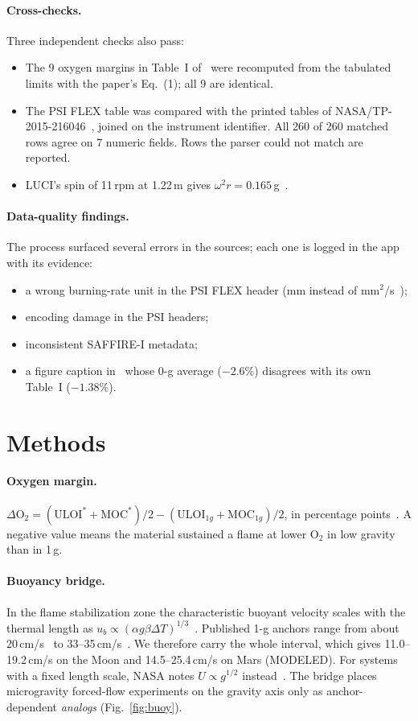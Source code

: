 \documentclass[10pt]{article}
\begin{document}
\paragraph{Cross-checks.}
Three independent checks also pass:
\begin{itemize}
\item The 9 oxygen margins in Table~I of~\cite{olson2012} were recomputed from the tabulated limits with the
paper's Eq.~(1); all 9 are identical.
\item The PSI FLEX table was compared with the printed tables of NASA/TP-2015-216046~\cite{flex2015}, joined on the
instrument identifier. All 260 of 260 matched rows agree on 7 numeric fields. Rows the parser could not match are
reported.
\item LUCI's spin of 11\,rpm at 1.22\,m gives $\omega^2 r = 0.165$\,g~\cite{luci2025}.
\end{itemize}

\paragraph{Data-quality findings.}
The process surfaced several errors in the sources; each one is logged in the app with its evidence:
\begin{itemize}
\item a wrong burning-rate unit in the PSI FLEX header (mm instead of mm$^2$/s~\cite{flex2015});
\item encoding damage in the PSI headers;
\item inconsistent SAFFIRE-I metadata;
\item a figure caption in~\cite{olson2012} whose 0-g average ($-2.6$\%) disagrees with its own Table~I
($-1.38$\%).
\end{itemize}

\section{Methods}
\paragraph{Oxygen margin.}
$\Delta\mathrm{O_2} = (\mathrm{ULOI}^* + \mathrm{MOC}^*)/2 - (\mathrm{ULOI}_{1g} + \mathrm{MOC}_{1g})/2$, in
percentage points~\cite{olson2012}. A negative value means the material sustained a flame at lower O$_2$ in low
gravity than in 1\,g.

\paragraph{Buoyancy bridge.}
In the flame stabilization zone the characteristic buoyant velocity scales with the thermal length as
$u_b \propto (\alpha g \beta \Delta T)^{1/3}$~\cite{konno2024,fom2021}. Published 1-g anchors range from about
20\,cm/s~\cite{fom2021} to 33--35\,cm/s~\cite{konno2024,nakaya}. We therefore carry the whole interval, which gives
11.0--19.2\,cm/s on the Moon and 14.5--25.4\,cm/s on Mars (MODELED). For systems with a fixed length scale, NASA
notes $U \propto g^{1/2}$ instead~\cite{fom2021}. The bridge places microgravity forced-flow experiments on the
gravity axis only as anchor-dependent \emph{analogs} (Fig.~\ref{fig:buoy}).
\end{document}
